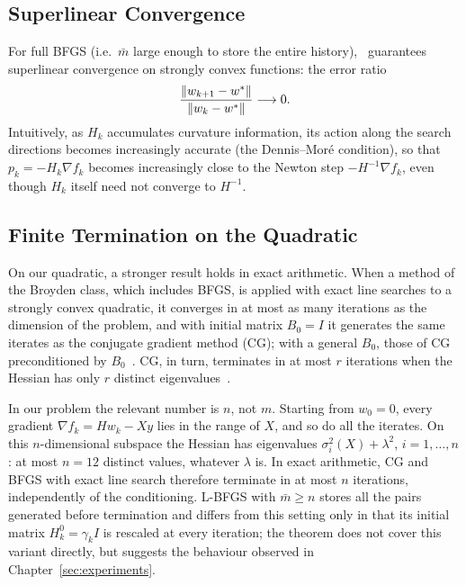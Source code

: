 \subsection{Superlinear Convergence}

\noindent For full BFGS (i.e.\ $\bar{m}$ large enough to store the entire
history),~\cite[Theorem~8.6]{nocedal2006numerical} guarantees superlinear
convergence on strongly convex functions: the error ratio
\begin{equation}
\label{eq:superlin}
    \frac{\left\|w_{k+1} - w^*\right\|}{\left\|w_k - w^*\right\|} \longrightarrow 0.
\end{equation}
Intuitively, as $H_k$ accumulates curvature information, its action along
the search directions becomes increasingly accurate (the Dennis--Moré
condition), so that $p_k = -H_k\nabla f_k$ becomes increasingly close to the
Newton step $-H^{-1}\nabla f_k$, even though $H_k$ itself need not converge
to $H^{-1}$.

\subsection{Finite Termination on the Quadratic}
\label{sec:finite_termination}

\noindent On our quadratic, a stronger result holds in exact arithmetic. When
a method of the Broyden class, which includes BFGS, is applied with exact
line searches to a strongly convex quadratic, it converges in at most as many
iterations as the dimension of the problem, and with initial matrix
$B_0 = I$ it generates the same iterates as the conjugate gradient method
(CG); with a general $B_0$, those of CG preconditioned by
$B_0$~\cite[Theorem~8.4]{nocedal2006numerical}. CG, in turn, terminates in at
most $r$ iterations when the Hessian has only $r$ distinct
eigenvalues~\cite[Theorem~5.4]{nocedal2006numerical}.

\noindent In our problem the relevant number is $n$, not $m$. Starting from
$w_0 = 0$, every gradient $\nabla f_k = H w_k - Xy$ lies in the range of $X$,
and so do all the iterates. On this $n$-dimensional subspace the Hessian has
eigenvalues $\sigma_i^2(X) + \lambda^2$, $i = 1,\dots,n$: at most $n = 12$
distinct values, whatever $\lambda$ is. In exact arithmetic, CG and BFGS with
exact line search therefore terminate in at most $n$ iterations, independently
of the conditioning. L-BFGS with $\bar{m} \geq n$ stores all the pairs
generated before termination and differs from this setting only in that
its initial matrix $H_k^0 = \gamma_k I$ is rescaled at every iteration; the
theorem does not cover this variant directly, but suggests the behaviour
observed in Chapter~\ref{sec:experiments}.

